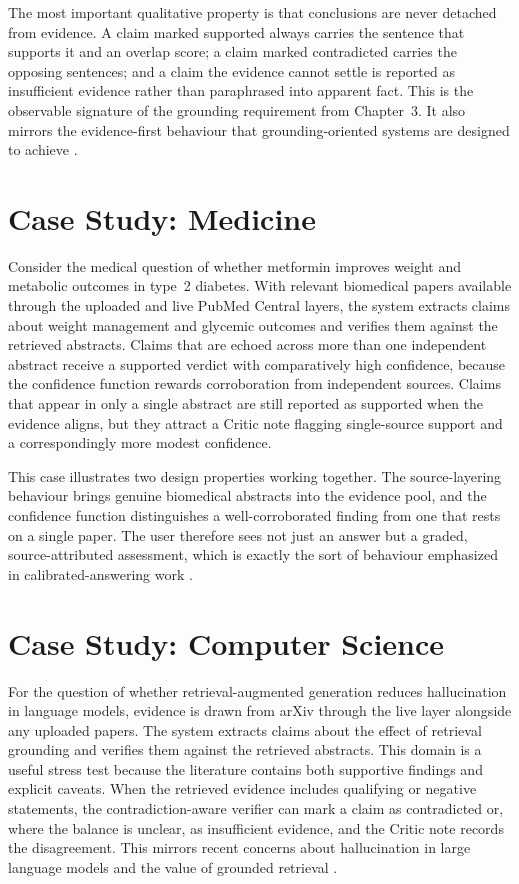 The most important qualitative property is that conclusions are never detached from evidence. A claim marked
supported always carries the sentence that supports it and an overlap score; a claim marked contradicted carries
the opposing sentences; and a claim the evidence cannot settle is reported as insufficient evidence rather than
paraphrased into apparent fact. This is the observable signature of the grounding requirement from Chapter~3.
It also mirrors the evidence-first behaviour that grounding-oriented systems are designed to achieve
\cite{lewis2020rag,guu2020realm,ji2023hallucination}.

\section{Case Study: Medicine }

Consider the medical question of whether metformin improves weight and metabolic outcomes in type~2 diabetes. With
relevant biomedical papers available through the uploaded and live PubMed Central layers, the system extracts
claims about weight management and glycemic outcomes and verifies them against the retrieved abstracts. Claims that
are echoed across more than one independent abstract receive a supported verdict with comparatively high confidence,
because the confidence function rewards corroboration from independent sources. Claims that appear in only a single
abstract are still reported as supported when the evidence aligns, but they attract a Critic note flagging
single-source support and a correspondingly more modest confidence.

This case illustrates two design properties working together. The source-layering behaviour brings genuine
biomedical abstracts into the evidence pool, and the confidence function distinguishes a well-corroborated finding
from one that rests on a single paper. The user therefore sees not just an answer but a graded, source-attributed
assessment, which is exactly the sort of behaviour emphasized in calibrated-answering work
\cite{kadavath2022language,shinn2023reflexion}.

\section{Case Study: Computer Science }

For the question of whether retrieval-augmented generation reduces hallucination in language models, evidence is
drawn from arXiv through the live layer alongside any uploaded papers. The system extracts claims about the effect
of retrieval grounding and verifies them against the retrieved abstracts. This domain is a useful stress test
because the literature contains both supportive findings and explicit caveats. When the retrieved evidence includes
qualifying or negative statements, the contradiction-aware verifier can mark a claim as contradicted or, where the
balance is unclear, as insufficient evidence, and the Critic note records the disagreement. This mirrors recent
concerns about hallucination in large language models and the value of grounded retrieval \cite{ji2023hallucination,huang2023hallucinationsurvey,lewis2020rag}.


